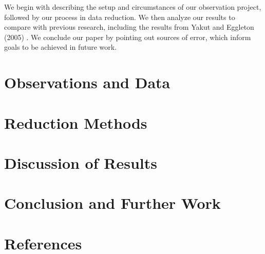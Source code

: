 \documentclass{article}
\begin{document}
    We begin with describing the setup and circumstances of our observation project, followed by our process in data reduction. We then analyze our results to compare with previous research, including the results from Yakut and Eggleton (2005) \cite{2005ApJ...629.1055Y}. We conclude our paper by pointing out sources of error, which inform goals to be achieved in future work.

\section{Observations and Data}
\section{Reduction Methods}
\section{Discussion of Results}
\section{Conclusion and Further Work}
\section{References}
\end{document}
